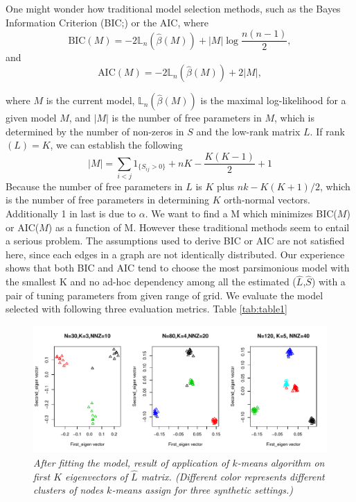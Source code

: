 \documentclass[AMS,STIX1COL]{WileyNJD-v2}
\begin{document}
One might wonder how traditional model selection methods, such as the Bayes Information Criterion (BIC;\cite{schwarz1978estimating}) or the AIC, where
\[
\mbox{BIC}(M) = -2  \mathbb{L}_n( \hat{\beta}(M)) + |M| \log \frac{n(n-1)}{2},
\]
and
\[
\mbox{AIC}(M) = -2  \mathbb{L}_n( \hat{\beta}(M)) + 2|M|,
\]

where $M$ is the current model,
$\mathbb{L}_n( \hat{\beta}(M))$ is the maximal log-likelihood for a given model $M$,
and $|M|$ is the number of free parameters in $M$, which is determined by the number of non-zeros in $S$ and the low-rank matrix $L$.
If rank$(L)=K$, we can establish the following
\[
|M| = \sum_{i < j}1_{\{S_{ij} > 0\}} + n K - \frac{K(K-1)}{2} + 1
\]
Because the number of free parameters in $L$ is $K$ plus $nk - K(K+1)/2$, which is the number of free parameters in determining $K$ orth-normal vectors. 
Additionally 1 in last is due to $\alpha$.
We want to find a M which minimizes BIC($M$) or AIC($M$) as a function of M. 
However these traditional methods seem to entail a serious problem. 
The assumptions used to derive BIC or AIC are not satisfied here, since each edges in a graph are not identically distributed.
Our experience shows that both BIC and AIC tend to choose the most parsimonious model with the smallest K and no ad-hoc dependency among all the estimated ($\hat{L}$,$\hat{S}$) with a pair of tuning parameters from given range of grid. 
We evaluate the model selected  
with following three evaluation metrics.
Table \ref{tab:table1}

\begin{figure}[h]
\includegraphics[width=1\textwidth]{Fig1.pdf}
\caption{\it After fitting the model, result of application of $k$-means algorithm on first $K$ eigenvectors of $\hat{L}$ matrix. (Different color represents different clusters of nodes $k$-means assign for three synthetic settings.) }
\label{fig:figure1}
\end{figure}
\end{document}
